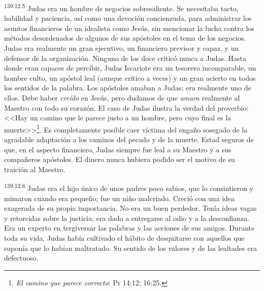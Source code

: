 \par 
\textsuperscript{139:12.5} Judas era un hombre de negocios sobresaliente. Se necesitaba tacto, habilidad y paciencia, así como una devoción concienzuda, para administrar los asuntos financieros de un idealista como Jesús, sin mencionar la lucha contra los métodos desordenados de algunos de sus apóstoles en el tema de los negocios. Judas era realmente un gran ejecutivo, un financiero previsor y capaz, y un defensor de la organización. Ninguno de los doce criticó nunca a Judas. Hasta donde eran capaces de percibir, Judas Iscariote era un tesorero incomparable, un hombre culto, un apóstol leal (aunque crítico a veces) y un gran acierto en todos los sentidos de la palabra. Los apóstoles amaban a Judas; era realmente uno de ellos. Debe haber \textit{creído} en Jesús, pero dudamos de que \textit{amara} realmente al Maestro con todo su corazón. El caso de Judas ilustra la verdad del proverbio: <<Hay un camino que le parece justo a un hombre, pero cuyo final es la muerte>>\footnote{\textit{El camino que parece correcto}: Pr 14:12; 16:25.}. Es completamente posible caer víctima del engaño sosegado de la agradable adaptación a los caminos del pecado y de la muerte. Estad seguros de que, en el aspecto financiero, Judas siempre fue leal a su Maestro y a sus compañeros apóstoles. El dinero nunca hubiera podido ser el motivo de su traición al Maestro.

\par 
\textsuperscript{139:12.6} Judas era el hijo único de unos padres poco sabios, que lo consintieron y mimaron cuando era pequeño; fue un niño malcriado. Creció con una idea exagerada de su propia importancia. No era un buen perdedor. Tenía ideas vagas y retorcidas sobre la justicia; era dado a entregarse al odio y a la desconfianza. Era un experto en tergiversar las palabras y las acciones de sus amigos. Durante toda su vida, Judas había cultivado el hábito de desquitarse con aquellos que suponía que lo habían maltratado. Su sentido de los valores y de las lealtades era defectuoso.


